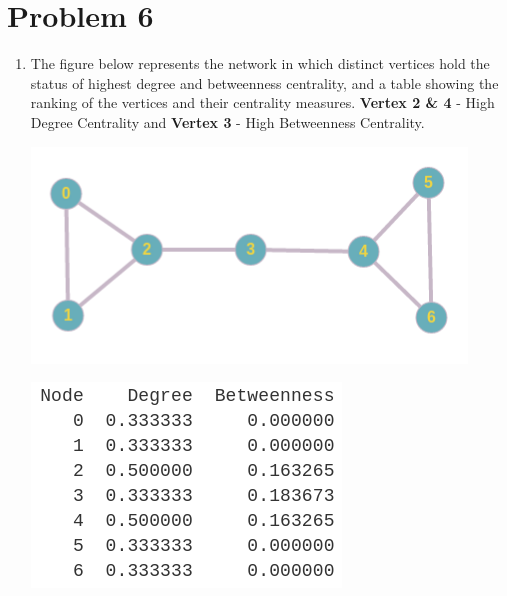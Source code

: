 \documentclass{article}
\begin{document}
\section*{Problem 6}
\begin{enumerate}[label=(\alph*)]
\item
The figure below represents the network in which distinct vertices hold the status of highest degree and betweenness centrality, and a table showing the ranking of the vertices and their centrality measures. \textbf{Vertex 2 \& 4} - High Degree Centrality and \textbf{Vertex 3} - High Betweenness Centrality.

\begin{center}
\begin{minipage}[b]{0.3\textwidth}
    \includegraphics[width=\textwidth]{images/6a.png}
\end{minipage}
\begin{minipage}[b]{0.3\textwidth}
  \includegraphics[width=\textwidth]{images/6a1.png}
\end{minipage} 
\end{center}
\end{enumerate}
\newpage
\end{document}
